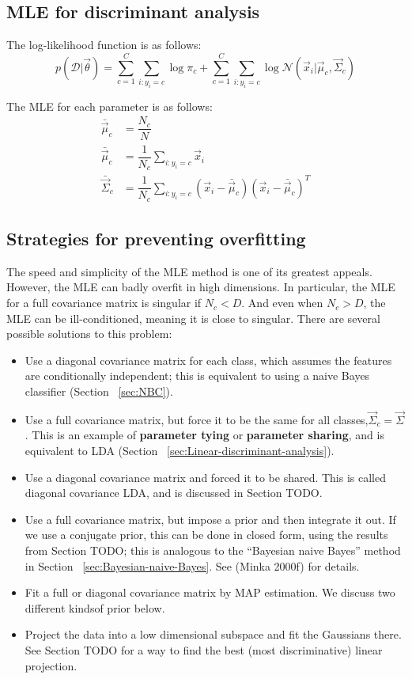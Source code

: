 \subsection{MLE for discriminant analysis}
The log-likelihood function is as follows:
\begin{equation}
p(\mathcal{D}|\vec{\theta})=\sum\limits_{c=1}^C{\sum\limits_{i:y_i=c}{\log\pi_c}}+\sum\limits_{c=1}^C{\sum\limits_{i:y_i=c}{\log\mathcal{N}(\vec{x}_i|\vec{\mu}_c,\vec{\Sigma}_c)}}
\end{equation}

The MLE for each parameter is as follows:
\begin{align}
\bar{\vec{\mu}}_c& = \dfrac{N_c}{N} \\
\bar{\vec{\mu}}_c& = \dfrac{1}{N_c}\sum\limits_{i:y_i=c}\vec{x}_i \\
\bar{\vec{\Sigma}}_c& = \dfrac{1}{N_c}\sum\limits_{i:y_i=c}(\vec{x}_i-\bar{\vec{\mu}}_c)(\vec{x}_i-\bar{\vec{\mu}}_c)^T
\end{align}


\subsection{Strategies for preventing overfitting}
The speed and simplicity of the MLE method is one of its greatest appeals. However, the MLE can badly overfit in high dimensions. In particular, the MLE for a full covariance matrix is singular if $N_c <D$. And even when $N_c >D$, the MLE can be ill-conditioned, meaning it is close to singular. There are several possible solutions to this problem:
\begin{itemize}
\item{Use a diagonal covariance matrix for each class, which assumes the features are conditionally independent; this is equivalent to using a naive Bayes classifier (Section ~\ref{sec:NBC})}.
\item{Use a full covariance matrix, but force it to be the same for all classes,$\vec{\Sigma}_c=\vec{\Sigma}$. This is an example of \textbf{parameter tying} or \textbf{parameter sharing}, and is equivalent to LDA (Section ~\ref{sec:Linear-discriminant-analysis}).}
\item{Use a diagonal covariance matrix and forced it to be shared. This is called diagonal covariance LDA, and is discussed in Section TODO.}
\item{Use a full covariance matrix, but impose a prior and then integrate it out. If we use a conjugate prior, this can be done in closed form, using the results from Section TODO; this is analogous to the “Bayesian naive Bayes” method in Section ~\ref{sec:Bayesian-naive-Bayes}. See (Minka 2000f) for details.}
\item{Fit a full or diagonal covariance matrix by MAP estimation. We discuss two different kindsof prior below.}
\item{Project the data into a low dimensional subspace and fit the Gaussians there. See Section TODO for a way to find the best (most discriminative) linear projection.}
\end{itemize}

